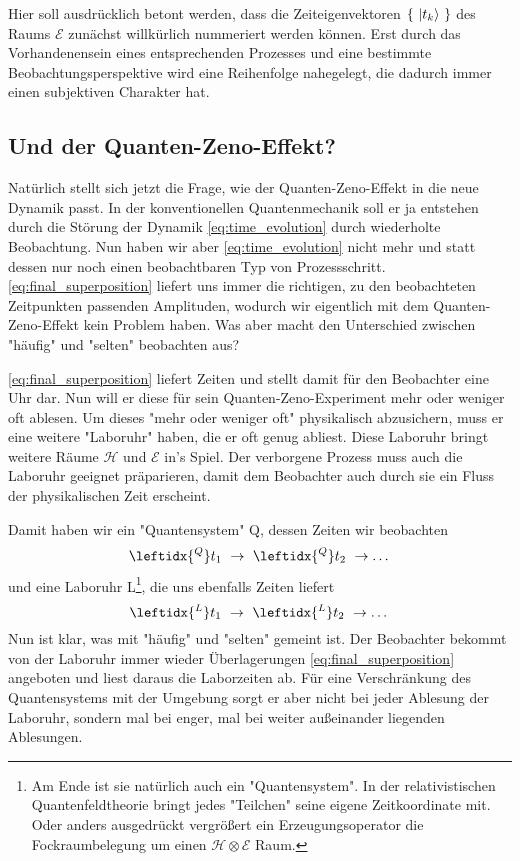 \documentclass[12pt]{article}
\begin{document}
Hier soll ausdrücklich betont werden, dass die Zeiteigenvektoren $\{\ \ket{t_k}\ \}$ des Raums $\mathscr{E}$ zunächst willkürlich nummeriert werden können. Erst durch das Vorhandenensein eines entsprechenden Prozesses und eine bestimmte Beobachtungsperspektive wird eine Reihenfolge nahegelegt, die dadurch immer einen subjektiven Charakter hat.

\subsection{Und der Quanten-Zeno-Effekt?}

Natürlich stellt sich jetzt die Frage, wie der Quanten-Zeno-Effekt in die neue Dynamik passt. In der konventionellen Quantenmechanik soll er ja entstehen durch die Störung der Dynamik \eqref{eq:time_evolution} durch wiederholte Beobachtung. Nun haben wir aber \eqref{eq:time_evolution} nicht mehr und statt dessen nur noch einen beobachtbaren Typ von Prozessschritt. \eqref{eq:final_superposition} liefert uns immer die richtigen, zu den beobachteten Zeitpunkten passenden Amplituden, wodurch wir eigentlich mit dem Quanten-Zeno-Effekt kein Problem haben. Was aber macht den Unterschied zwischen "häufig" und "selten" beobachten aus?

\eqref{eq:final_superposition} liefert Zeiten und stellt damit für den Beobachter eine Uhr dar. Nun will er diese für sein Quanten-Zeno-Experiment mehr oder weniger oft ablesen. Um dieses "mehr oder weniger oft" physikalisch abzusichern, muss er eine weitere "Laboruhr" haben, die er oft genug abliest. Diese Laboruhr bringt weitere Räume $\mathscr{H}$ und $\mathscr{E}$ in's Spiel. Der verborgene Prozess muss auch die Laboruhr geeignet präparieren, damit dem Beobachter auch durch sie ein Fluss der physikalischen Zeit erscheint.

Damit haben wir ein "Quantensystem" Q, dessen Zeiten wir beobachten
\begin{equation*}
\leftidx{^Q}t_1\ \rightarrow\ \leftidx{^Q}t_2\ \rightarrow \dots
\end{equation*}
und eine Laboruhr L\footnote{Am Ende ist sie natürlich auch ein "Quantensystem". In der relativistischen Quantenfeldtheorie bringt jedes "Teilchen" seine eigene Zeitkoordinate mit. Oder anders ausgedrückt vergrößert ein Erzeugungsoperator die Fockraumbelegung um einen $\mathscr{H} \otimes \mathscr{E}$ Raum.}, die uns ebenfalls Zeiten liefert
\begin{equation*}
\leftidx{^L}t_1\ \rightarrow\ \leftidx{^L}t_2 \ \rightarrow \dots
\end{equation*}
Nun ist klar, was mit "häufig" und "selten" gemeint ist. Der Beobachter bekommt von der Laboruhr immer wieder Überlagerungen \eqref{eq:final_superposition} angeboten und liest daraus die Laborzeiten ab. Für eine Verschränkung des Quantensystems mit der Umgebung sorgt er aber nicht bei jeder Ablesung der Laboruhr, sondern mal bei enger, mal bei weiter außeinander liegenden Ablesungen. 
\end{document}
